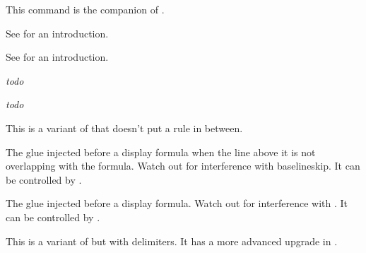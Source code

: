 \startnewprimitive[title={\prm {Ustopmathmode}}]

This command is the companion of .

\stopnewprimitive

\startnewprimitive[title={\prm {Ustretched}}]

See  for an introduction.

\stopnewprimitive

\startnewprimitive[title={\prm {Ustretchedwithdelims}}]

See  for an introduction.

\stopnewprimitive

\startnewprimitive[title={\prm {Uunderdelimiter}}]

{\em todo} 

\stopnewprimitive

\startnewprimitive[title={\prm {Uvextensible}}]

{\em todo} 

\stopnewprimitive

\startoldprimitive[title={\prm {above}}][obsolete=yes]

This is a variant of  that doesn't put a rule in between.

\stopoldprimitive

\startoldprimitive[title={\prm {abovedisplayshortskip}}]

The glue injected before a display formula when the line above it is not
overlapping with the formula. Watch out for interference with \prm
{baselineskip}. It can be controlled by .

\stopoldprimitive

\startoldprimitive[title={\prm {abovedisplayskip}}]

The glue injected before a display formula. Watch out for interference with
. It can be controlled by .

\stopoldprimitive

\startoldprimitive[title={\prm {abovewithdelims}}][obsolete=yes]

This is a variant of  but with delimiters. It has a more advanced
upgrade in .

\stopoldprimitive

\startoldprimitive[title={\prm {accent}}][obsolete=yes]

